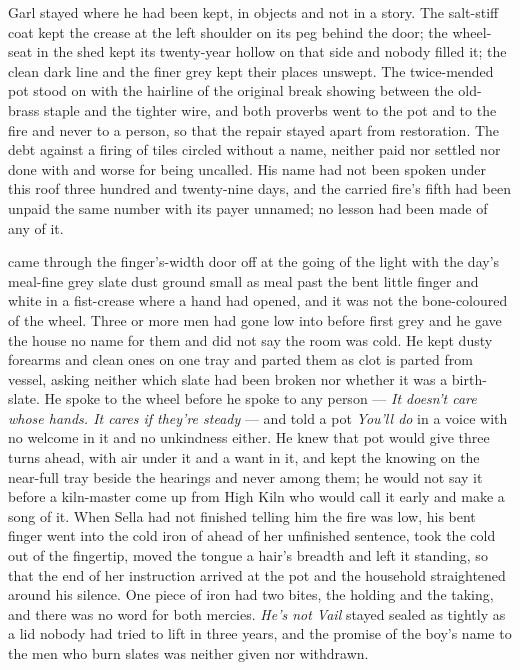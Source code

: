 Garl stayed where he had been kept, in objects and not in a story. The salt-stiff coat kept the crease at the left shoulder on its peg behind the door; the wheel-seat in the shed kept its twenty-year hollow on that side and nobody filled it; the clean dark line and the finer grey kept their places unswept. The twice-mended pot stood on  with the hairline of the original break showing between the old-brass staple and the tighter wire, and both proverbs went to the pot and to the fire and never to a person, so that the repair stayed apart from restoration. The debt against a firing of tiles circled without a name, neither paid nor settled nor done with and worse for being uncalled. His name had not been spoken under this roof three hundred and twenty-nine days, and the carried fire's fifth had been unpaid the same number with its payer unnamed; no lesson had been made of any of it.

 came through the finger's-width door off  at the going of the light with the day's meal-fine grey slate dust ground small as meal past the bent little finger and white in a fist-crease where a hand had opened, and it was not the bone-coloured  of the wheel. Three or more men had gone low into  before first grey and he gave the house no name for them and did not say the room was cold. He kept dusty forearms and clean ones on one tray and parted them as clot is parted from vessel, asking neither which slate had been broken nor whether it was a birth-slate. He spoke to the wheel before he spoke to any person --- \emph{It doesn't care whose hands. It cares if they're steady} --- and told a pot \emph{You'll do} in a voice with no welcome in it and no unkindness either. He knew  that pot would give three turns ahead, with air under it and a want in it, and kept the knowing on the near-full tray beside the hearings and never among them; he would not say it before a kiln-master come up from High Kiln who would call it early and make a song of it. When Sella had not finished telling him the fire was low, his bent finger went into the cold iron of  ahead of her unfinished sentence, took the cold out of the fingertip, moved the tongue a hair's breadth and left it standing, so that the end of her instruction arrived at the pot and the household straightened around his silence. One piece of iron had two bites, the holding and the taking, and there was no  word for both mercies. \emph{He's not Vail} stayed sealed as tightly as a lid nobody had tried to lift in three years, and the promise of the boy's name to the men who burn slates was neither given nor withdrawn.

